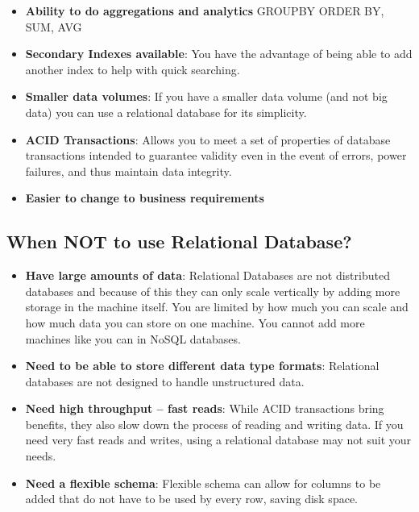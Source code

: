 \documentclass[
	paper=a4,%
	pagesize,%
	8pt, fleqn,%
	headings=small,%
	notitlepage,%
	parskip=never]%
	{scrreprt}
\begin{document}
\begin{multicols*}{3}
\begin{itemize}
\item \textbf{Ability to do aggregations and analytics} GROUPBY ORDER BY, SUM, AVG

\item \textbf{Secondary Indexes available}: You have the advantage of being able to add another index to help with quick searching.

\item \textbf{Smaller data volumes}: If you have a smaller data volume (and not big data) you can use a relational database for its simplicity.

\item \textbf{ACID Transactions}: Allows you to meet a set of properties of database transactions intended to guarantee validity even in the event of errors, power failures, and thus maintain data integrity.

\item \textbf{Easier to change to business requirements}

\end{itemize}

\subsection{When NOT to use Relational Database?} \label{relational_disad}
\begin{itemize}
\item \textbf{Have large amounts of data}: Relational Databases are not distributed databases and because of this they can only scale vertically by adding more storage in the machine itself. You are limited by how much you can scale and how much data you can store on one machine. You cannot add more machines like you can in NoSQL databases.

\item \textbf{Need to be able to store different data type formats}: Relational databases are not designed to handle unstructured data.

\item \textbf{Need high throughput -- fast reads}: While ACID transactions bring benefits, they also slow down the process of reading and writing data. If you need very fast reads and writes, using a relational database may not suit your needs.

\item \textbf{Need a flexible schema}: Flexible schema can allow for columns to be added that do not have to be used by every row, saving disk space.


\end{itemize}
\end{multicols*}
\end{document}
